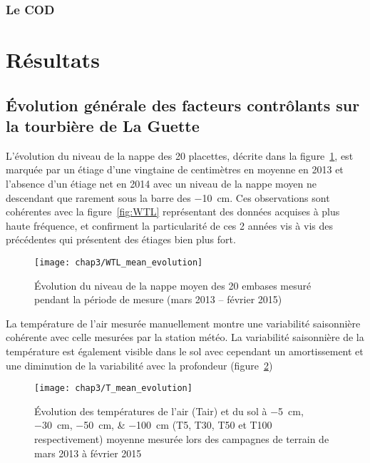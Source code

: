 \subsubsection{Le COD}

\section{Résultats}

\subsection{Évolution générale des facteurs contrôlants sur la tourbière de La Guette}

L'évolution du niveau de la nappe des 20 placettes, décrite dans la figure~\ref{fig:WTL_mean_evolution}, est marquée par un étiage d'une vingtaine de centimètres en moyenne en 2013 et l'absence d'un étiage net en 2014 avec un niveau de la nappe moyen ne descendant que rarement sous la barre des \SI{-10}{\cm}.
Ces observations sont cohérentes avec la figure~\ref{fig:WTL} représentant des données acquises à plus haute fréquence, et confirment la particularité de ces 2 années vis à vis des précédentes qui présentent des étiages bien plus fort.

\begin{figure}
\centering
\texttt{[image: chap3/WTL\_mean\_evolution]}
\caption{Évolution du niveau de la nappe moyen des 20 embases mesuré pendant la période de mesure (mars 2013 -- février 2015)}
\label{fig:WTL_mean_evolution}
\end{figure}

La température de l'air mesurée manuellement montre une variabilité saisonnière cohérente avec celle mesurées par la station météo. 
La variabilité saisonnière de la température est également visible dans le sol avec cependant un amortissement et une diminution de la variabilité avec la profondeur (figure~\ref{fig:T_mean_evolution})


\begin{figure}
\centering
\texttt{[image: chap3/T\_mean\_evolution]}
\caption{Évolution des températures de l'air (Tair) et du sol à \SIlist{-5;-30;-50;-100}{\centi\metre} (T5, T30, T50 et T100 respectivement) moyenne mesurée lors des campagnes de terrain de mars 2013 à février 2015}
\label{fig:T_mean_evolution}
\end{figure}

